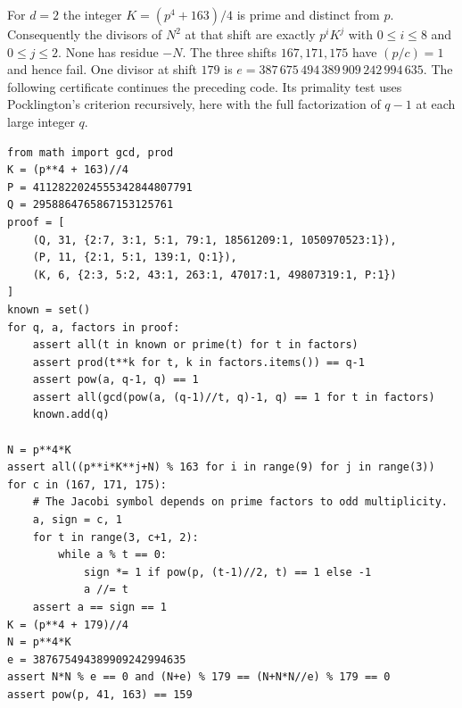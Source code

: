 \documentclass[a4paper,11pt]{article}
\theoremstyle{definition}\newtheorem{question}[theorem]{Question}
\begin{document}
For $d=2$ the integer $K=(p^4+163)/4$ is prime and distinct from $p$.
Consequently the divisors of $N^2$ at that shift are exactly
$p^i K^j$ with $0\le i\le8$ and $0\le j\le2$. None has residue $-N$.
The three shifts $167,171,175$ have $(p/c)=1$ and hence fail. One divisor
at shift $179$ is $e=387\,675\,494\,389\,909\,242\,994\,635$.
The following certificate continues the preceding code. Its primality
test uses Pocklington's criterion recursively, here with the full
factorization of $q-1$ at each large integer $q$.
\begin{Verbatim}[fontsize=\small]
from math import gcd, prod
K = (p**4 + 163)//4
P = 4112822024555342844807791
Q = 2958864765867153125761
proof = [
    (Q, 31, {2:7, 3:1, 5:1, 79:1, 18561209:1, 1050970523:1}),
    (P, 11, {2:1, 5:1, 139:1, Q:1}),
    (K, 6, {2:3, 5:2, 43:1, 263:1, 47017:1, 49807319:1, P:1})
]
known = set()
for q, a, factors in proof:
    assert all(t in known or prime(t) for t in factors)
    assert prod(t**k for t, k in factors.items()) == q-1
    assert pow(a, q-1, q) == 1
    assert all(gcd(pow(a, (q-1)//t, q)-1, q) == 1 for t in factors)
    known.add(q)

N = p**4*K
assert all((p**i*K**j+N) % 163 for i in range(9) for j in range(3))
for c in (167, 171, 175):
    # The Jacobi symbol depends on prime factors to odd multiplicity.
    a, sign = c, 1
    for t in range(3, c+1, 2):
        while a % t == 0:
            sign *= 1 if pow(p, (t-1)//2, t) == 1 else -1
            a //= t
    assert a == sign == 1
K = (p**4 + 179)//4
N = p**4*K
e = 387675494389909242994635
assert N*N % e == 0 and (N+e) % 179 == (N+N*N//e) % 179 == 0
assert pow(p, 41, 163) == 159
\end{Verbatim}
\end{document}
